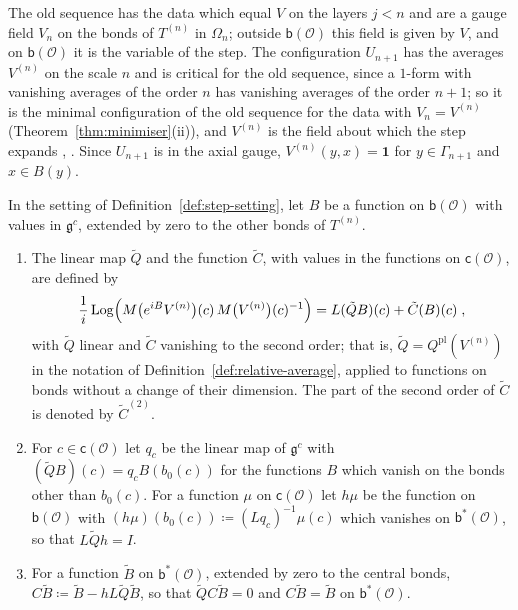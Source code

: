 \documentclass[11pt]{preprint}
\newcommand{\id}{\mathbf 1}
\numberwithin{equation}{section}
\begin{document}
The old sequence has the data which equal $V$ on the layers $j < n$ and are a gauge field $V_n$ on the bonds of $T^{(n)}$ in $\Omega_n$; outside $\mathsf b(\mathcal O)$ this field is given by $V$, and on $\mathsf b(\mathcal O)$ it is the variable of the step. The configuration $U_{n+1}$ has the averages $V^{(n)}$ on the scale $n$ and is critical for the old sequence, since a $1$-form with vanishing averages of the order $n$ has vanishing averages of the order $n + 1$; so it is the minimal configuration of the old sequence for the data with $V_n = V^{(n)}$ (Theorem~\ref{thm:minimiser}(ii)), and $V^{(n)}$ is the field about which the step expands \cite[(2.3), p.~265]{BalabanRG1}, \cite[(3.10), p.~266]{BalabanCRE}. Since $U_{n+1}$ is in the axial gauge, $V^{(n)}(y, x) = \id$ for $y \in \Gamma_{n+1}$ and $x \in B(y)$.

\begin{definition}\label{def:unit-average}
In the setting of Definition~\ref{def:step-setting}, let $B$ be a function on $\mathsf b(\mathcal O)$ with values in $\mathfrak g^c$, extended by zero to the other bonds of $T^{(n)}$.
\begin{enumerate}[label=(\roman*)]
\item The linear map $\tilde Q$ and the function $\tilde C$, with values in the functions on $\mathsf c(\mathcal O)$, are defined by
\begin{equation}\label{eq:unit-average}
    \frac{1}{i}\operatorname{Log}\Bigl(M\bigl(e^{iB}V^{(n)}\bigr)(c)\,M\bigl(V^{(n)}\bigr)(c)^{-1}\Bigr) = L(\tilde QB)(c) + \tilde C(B)(c)\;,
\end{equation}
with $\tilde Q$ linear and $\tilde C$ vanishing to the second order; that is, $\tilde Q = Q^{\mathrm{pl}}(V^{(n)})$ in the notation of Definition~\ref{def:relative-average}, applied to functions on bonds without a change of their dimension. The part of the second order of $\tilde C$ is denoted by $\tilde C^{(2)}$.
\item For $c \in \mathsf c(\mathcal O)$ let $q_c$ be the linear map of $\mathfrak g^c$ with $(\tilde QB)(c) = q_cB(b_0(c))$ for the functions $B$ which vanish on the bonds other than $b_0(c)$. For a function $\mu$ on $\mathsf c(\mathcal O)$ let $h\mu$ be the function on $\mathsf b(\mathcal O)$ with $(h\mu)(b_0(c)) \coloneqq (Lq_c)^{-1}\mu(c)$ which vanishes on $\mathsf b^*(\mathcal O)$, so that $L\tilde Qh = I$.
\item For a function $\tilde B$ on $\mathsf b^*(\mathcal O)$, extended by zero to the central bonds, $C\tilde B \coloneqq \tilde B - hL\tilde Q\tilde B$, so that $\tilde QC\tilde B = 0$ and $C\tilde B = \tilde B$ on $\mathsf b^*(\mathcal O)$.
\end{enumerate}
\end{definition}
\end{document}

